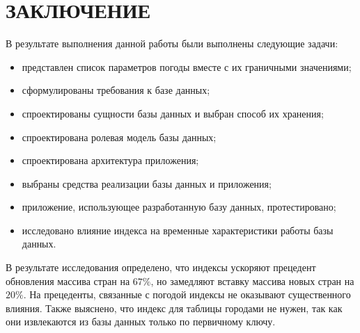 \chapter*{ЗАКЛЮЧЕНИЕ}

В результате выполнения данной работы были выполнены следующие задачи:
\begin{itemize}
    \item представлен список параметров погоды вместе с их граничными значениями;
    \item сформулированы требования к базе данных;
    \item спроектированы сущности базы данных и выбран способ их хранения;
    \item спроектирована ролевая модель базы данных;
    \item спроектирована архитектура приложения;
    \item выбраны средства реализации базы данных и приложения;
    \item приложение, использующее разработанную базу данных, протестировано;
    \item исследовано влияние индекса на временные характеристики работы базы данных.
\end{itemize}

В результате исследования определено, что индексы ускоряют прецедент обновления массива стран на $67\%$, но замедляют вставку массива новых стран на $20\%$.
На прецеденты, связанные с погодой индексы не оказывают существенного влияния.
Также выяснено, что индекс для таблицы городами не нужен, так как они извлекаются из базы данных только по первичному ключу.